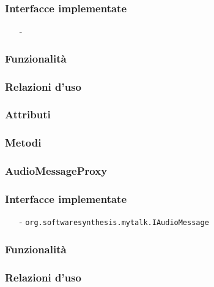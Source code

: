 \subsubsection*{Interfacce implementate}
\begin{itemize}[noitemsep,nolistsep]
  \item[-]
\end{itemize}

\subsubsection*{Funzionalità}

\subsubsection*{Relazioni d'uso}

\subsubsection*{Attributi}

\subsubsection*{Metodi}

\subsubsection{AudioMessageProxy}\label{sec:audiomessageproxy}

\subsubsection*{Interfacce implementate}
\begin{itemize}[noitemsep,nolistsep]
  \item[-]\texttt{org.softwaresynthesis.mytalk.IAudioMessage}
\end{itemize}

\subsubsection*{Funzionalità}

\subsubsection*{Relazioni d'uso}

